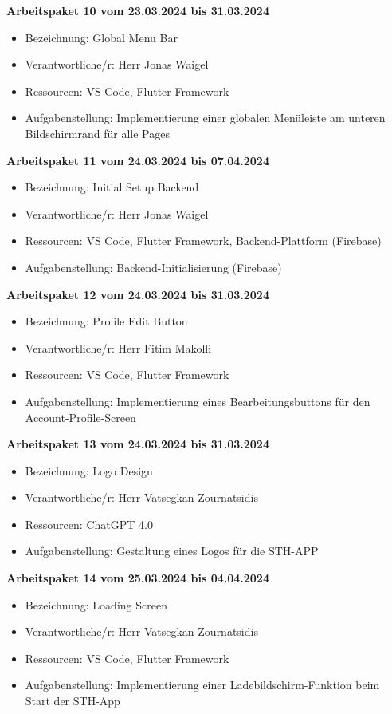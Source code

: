 \textbf{Arbeitspaket 10 vom 23.03.2024 bis 31.03.2024}
\begin{itemize}[itemsep=0pt]
    \item{Bezeichnung: Global Menu Bar} 
	\item{Verantwortliche/r: Herr Jonas Waigel} 
	\item{Ressourcen: VS Code, Flutter Framework} 
    \item{Aufgabenstellung: Implementierung einer globalen Menüleiste am unteren Bildschirmrand für alle Pages}
\end{itemize} 

\textbf{Arbeitspaket 11 vom 24.03.2024 bis 07.04.2024}
\begin{itemize}[itemsep=0pt]
    \item{Bezeichnung: Initial Setup Backend} 
	\item{Verantwortliche/r: Herr Jonas Waigel} 
	\item{Ressourcen: VS Code, Flutter Framework, Backend-Plattform (Firebase)}
    \item{Aufgabenstellung: Backend-Initialisierung (Firebase)}
\end{itemize}

\textbf{Arbeitspaket 12 vom 24.03.2024 bis 31.03.2024}
\begin{itemize}[itemsep=0pt]
    \item{Bezeichnung: Profile Edit Button} 
	\item{Verantwortliche/r: Herr Fitim Makolli} 
	\item{Ressourcen: VS Code, Flutter Framework} 
    \item{Aufgabenstellung: Implementierung eines Bearbeitungsbuttons für den Account-Profile-Screen}
\end{itemize}

\textbf{Arbeitspaket 13 vom 24.03.2024 bis 31.03.2024}
\begin{itemize}[itemsep=0pt]
    \item{Bezeichnung: Logo Design} 
	\item{Verantwortliche/r: Herr Vatsegkan Zournatsidis} 
	\item{Ressourcen: ChatGPT 4.0}
    \item{Aufgabenstellung: Gestaltung eines Logos für die STH-APP}
\end{itemize} 

\textbf{Arbeitspaket 14 vom 25.03.2024 bis 04.04.2024}
\begin{itemize}[itemsep=0pt]
    \item{Bezeichnung: Loading Screen} 
	\item{Verantwortliche/r: Herr Vatsegkan Zournatsidis} 
	\item{Ressourcen: VS Code, Flutter Framework} 
    \item{Aufgabenstellung: Implementierung einer Ladebildschirm-Funktion beim Start der STH-App}
\end{itemize}

